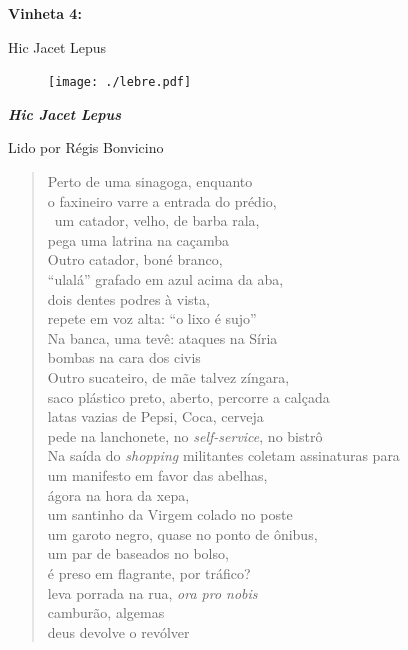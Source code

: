 \begin{absolutelynopagebreak}
\textbf{Vinheta 4:}

Hic Jacet Lepus

\thispagestyle{empty}

\begin{vplace}
\begin{figure}[H]
\begin{adjustwidth}{7.8cm}{}
  \vspace*{14.1cm}
  \texttt{[image: ./lebre.pdf]}  
\end{adjustwidth}

\end{figure}
\end{vplace}

\end{absolutelynopagebreak}

\pagebreak

\textbf{\emph{Hic Jacet Lepus}}

Lido por Régis Bonvicino

\begin{verse}
Perto de uma sinagoga, enquanto\\
o faxineiro varre a entrada do prédio,\\\
um catador, velho, de barba rala,\\
pega uma latrina na caçamba\\[5pt]
Outro catador, boné branco,\\
``ulalá'' grafado em azul acima da aba,\\
dois dentes podres à vista,\\
repete em voz alta: ``o lixo é sujo''\\[5pt]
Na banca, uma tevê: ataques na Síria\\
bombas na cara dos civis\\
Outro sucateiro, de mãe talvez zíngara,\\
saco plástico preto, aberto, percorre a calçada\\[5pt]
latas vazias de Pepsi, Coca, cerveja\\
pede na lanchonete, no \emph{self-service}, no bistrô\\
Na saída do \emph{shopping} militantes coletam assinaturas para\\
um manifesto em favor das abelhas,\\[5pt]
ágora na hora da xepa,\\
um santinho da Virgem colado no poste\\
um garoto negro, quase no ponto de ônibus,\\
um par de baseados no bolso,\\[5pt]
é preso em flagrante, por tráfico?\\
leva porrada na rua, \emph{ora pro nobis}\\
camburão, algemas\\
deus devolve o revólver
\end{verse}

